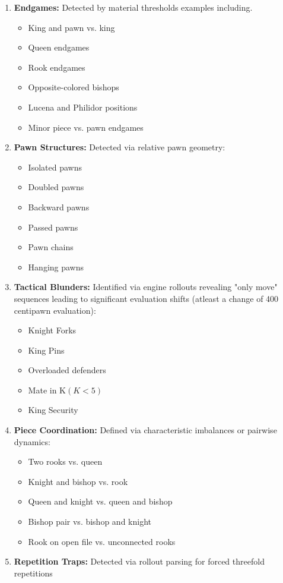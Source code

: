\begin{enumerate}
    \item \textbf{Endgames:} Detected by material thresholds examples including.
    \begin{itemize}
        \item King and pawn vs. king
        \item Queen endgames
        \item Rook endgames
        \item Opposite-colored bishops
        \item Lucena and Philidor positions
        \item Minor piece vs. pawn endgames
    \end{itemize}
    
    \item \textbf{Pawn Structures:} Detected via relative pawn geometry:
    \begin{itemize}
        \item Isolated pawns
        \item Doubled pawns
        \item Backward pawns
        \item Passed pawns
        \item Pawn chains
        \item Hanging pawns
    \end{itemize}
    
    \item \textbf{Tactical Blunders:} Identified via engine rollouts revealing "only move" sequences leading to significant evaluation shifts (atleast a change of 400 centipawn evaluation):
    \begin{itemize}
        \item Knight Forks
        \item King Pins
        \item Overloaded defenders
        \item Mate in K$(K<5)$
        \item King Security
    \end{itemize}
    
    \item \textbf{Piece Coordination:} Defined via characteristic imbalances or pairwise dynamics:
    \begin{itemize}
        \item Two rooks vs. queen
        \item Knight and bishop vs. rook
        \item Queen and knight vs. queen and bishop
        \item Bishop pair vs. bishop and knight
        \item Rook on open file vs. unconnected rooks
    \end{itemize}
    
    \item \textbf{Repetition Traps:} Detected via rollout parsing for forced threefold repetitions
\end{enumerate}


